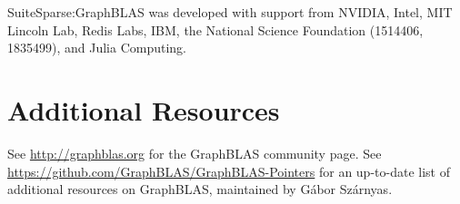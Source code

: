 \documentclass[12pt]{article}
\begin{document}
SuiteSparse:GraphBLAS was developed with support from
NVIDIA, Intel, MIT Lincoln Lab, Redis Labs, IBM,
the National Science Foundation (1514406, 1835499), and Julia Computing.

\section{Additional Resources}

See \url{http://graphblas.org} for the GraphBLAS community page.  See
\url{https://github.com/GraphBLAS/GraphBLAS-Pointers} for an up-to-date list of
additional resources on GraphBLAS, maintained by G{\'{a}}bor Sz{\'{a}}rnyas.

{\small
{}


}
\end{document}
